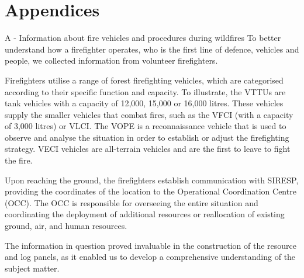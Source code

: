 \chapter{Appendices}

\Section A - Information about fire vehicles and procedures during wildfires
To better understand how a firefighter operates, who is the 
first line of defence, vehicles and people, we collected 
information from volunteer firefighters. \par
Firefighters utilise a range of forest firefighting vehicles, 
which are categorised according to their specific function and 
capacity. To illustrate, the VTTUs are tank vehicles with a 
capacity of 12,000, 15,000 or 16,000 litres. These vehicles 
supply the smaller vehicles that combat fires, such as the 
VFCI (with a capacity of 3,000 litres) or VLCI. The VOPE is a 
reconnaissance vehicle that is used to observe and analyse 
the situation in order to establish or adjust the firefighting
strategy. VECI vehicles are all-terrain vehicles and are the 
first to leave to fight the fire. \par
Upon reaching the ground, the firefighters establish 
communication with SIRESP, providing the coordinates of the 
location to the Operational Coordination Centre (OCC). The OCC
is responsible for overseeing the entire situation and 
coordinating the deployment of additional resources or 
reallocation of existing ground, air, and human resources. \par
The information in question proved invaluable in the construction 
of the resource and log panels, as it enabled us to develop a 
comprehensive understanding of the subject matter.
